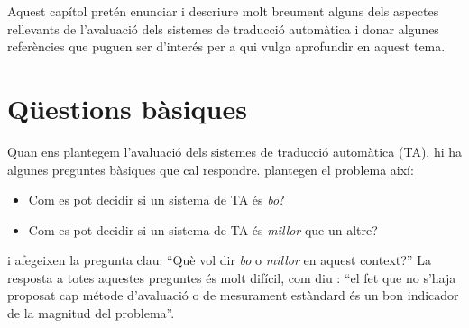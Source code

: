 















Aquest capítol pretén enunciar i descriure molt breument
alguns dels aspectes rellevants de l'avaluació dels sistemes de
traducció automàtica i donar algunes referències que
puguen ser d'interés per a qui vulga aprofundir en aquest tema.

\section{Qüestions bàsiques} 
Quan ens plantegem l'avaluació dels
sistemes de traducció automàtica (TA), hi ha algunes preguntes
bàsiques que cal respondre. \citet{arnold94b} plantegen
el problema així:
\begin{itemize}
\item Com es pot decidir si un sistema de TA és \emph{bo}?
\item Com es pot decidir si un sistema de TA és \emph{millor} que
  un altre?
\end{itemize}
i afegeixen la pregunta clau: 
``Què vol dir \emph{bo} o \emph{millor} en aquest
context?'' La resposta a totes aquestes preguntes és molt difícil,
com diu \citet{minnis94j}: ``el fet que no s'haja proposat cap métode
d'avaluació o de mesurament estàndard és un bon indicador
de la magnitud del problema''. 

